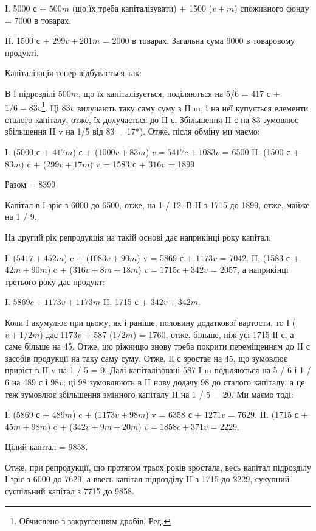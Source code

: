I.  5000 с + $500 m$ (що їх треба капіталізувати) + 1500 ($v + m$) споживного
фонду = 7000 в товарах.

II.    1500 с + $299 v + 201 m$ = 2000 в товарах. Загальна сума 9000 в
товаровому продукті.

Капіталізація тепер відбувається так:

В І підрозділі $500 m$, що їх капіталізується, поділяються на 5/6 =
417 с + $1 / 6 = 83 v$\footnote*{
Обчислено з закругленням дробів. Ред.
}. Ці $83 v$ вилучають таку саму суму з II m, і на
неї купується елементи сталого капіталу, отже, їх долучається до II с.
Збільшення II с на 83 зумовлює збільшення II v на 1/5 від 83 = 17*).
Отже, після обміну ми маємо:

I. (5000 с + $417 m$) с + ($1000 v + 83 m$) $v = 5417 c + 1083 v$ = 6500
II. (1500 с + $83 m$) c + ($299 v + 17 m$) v = 1583 с + $316 v$ = 1899

Разом = 8399

Капітал в І зріс з 6000 до 6500, отже, на 1 / 12. В II з 1715 до 1899,
отже, майже на 1 / 9.

На другий рік репродукція на такій основі дає наприкінці року
капітал:

І. ($5417 + 452 m$) c + ($1083 v + 90 m$) v = 5869 с + $1173 v$ = 7042.
II. (1583 с + $42 m + 90 m$) c + ($316 v + 8m + 18 m$) $v = 1715 c + 342 v$ =
2057,
а наприкінці третього року дає продукт:

I. $5869 c + 1173 v + 1173 m$
II. 1715 с + $342 v + 342 m$.

Коли І акумулює при цьому, як і раніше, половину додаткової вартости,
то І ($v + 1 / 2 m$) дає $1173 v$ + 587 ($1 / 2 m$) = 1760, отже, більше,
ніж усі 1715 ІІ с, а саме більше на 45. Отже, цю ріжницю знову треба
покрити переміщенням до II с засобів продукції на таку саму суму. Отже,
ІІ с зростає на 45, що зумовлює приріст в II v на 1 / 5 = 9. Далі капіталізовані
587 I m поділяються на 5 / 6 і 1 / 6 на 489 с і $98 v$; ці 98 зумовлюють
в II нову додачу 98 до сталого капіталу, а це теж зумовлює
збільшення змінного капіталу II на 1 / 5 = 20. Ми маємо тоді:

І. (5869 с + $489 m$) c + ($1173 v + 98 m$) v = 6358 с + $1271 v$ = 7629.
II. (1715 с + $45 m + 98 m$) c + ($342 v + 9 m + 20 m$) $v = 1858 c + 371 v$ = 2229.

Цілий капітал = 9858.

Отже, при репродукції, що протягом трьох років зростала,
весь капітал підрозділу І зріс з 6000 до 7629, а ввесь капітал підрозділу
II з 1715 до 2229, сукупний суспільний капітал з 7715 до 9858.
